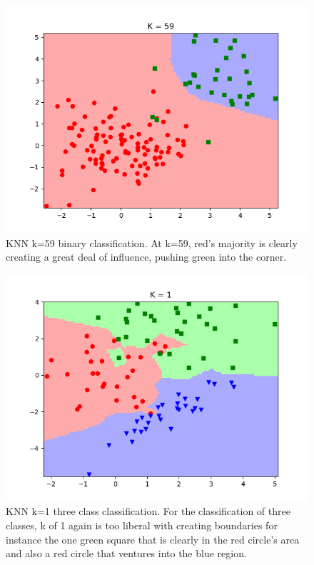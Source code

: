 \documentclass[10pt]{article}
\begin{document}
\begin{itemize}
\begin{figure}[H]
\centering
  \includegraphics{code/knn_binary_data-k-59.png}
 \caption{KNN k=59 binary classification. At k=59, red's majority is clearly creating a great deal of influence, pushing green into the corner.}
\end{figure}

\begin{figure}[H]
\centering
  \includegraphics{code/knn_three_class_data-k-1.png}
 \caption{KNN k=1 three class classification. For the classification of three classes, k of 1 again is too liberal with creating boundaries for instance the one green square that is clearly in the red circle's area and also a red circle that ventures into the blue region.}
\end{figure}


\end{itemize}
\end{document}

